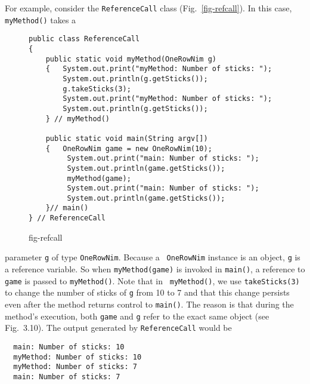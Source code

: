 For example, consider the {\tt ReferenceCall} class
(Fig.~\ref{fig-refcall}). In this case, {\tt myMethod()} takes a
\begin{figure}[h!]
\jjjprogstart
\begin{jjjlisting}
\begin{lstlisting}
public class ReferenceCall
{
    public static void myMethod(OneRowNim g)
    {   System.out.print("myMethod: Number of sticks: ");
        System.out.println(g.getSticks());
        g.takeSticks(3);
        System.out.print("myMethod: Number of sticks: ");
        System.out.println(g.getSticks());
    } // myMethod()

    public static void main(String argv[])
    {   OneRowNim game = new OneRowNim(10);
         System.out.print("main: Number of sticks: ");
         System.out.println(game.getSticks());
         myMethod(game);
         System.out.print("main: Number of sticks: ");
         System.out.println(game.getSticks());
    }// main()
} // ReferenceCall
\end{lstlisting}
\end{jjjlisting}
{fig-refcall}
\end{figure}
parameter {\tt g} of type {\tt OneRowNim}. Because a \mbox{\tt
OneRowNim} instance is an object, {\tt g} is a reference variable.  So
when {\tt myMethod(game)} is invoked in {\tt main()}, a reference to
{\tt game} is passed to {\tt myMethod()}. Note that in {\tt
myMethod()}, we use {\tt takeSticks(3)} to change the number of sticks
of {\tt g} from 10 to 7 and that this change persists even after the
method returns control to {\tt main()}. The reason is that during the
method's execution, both {\tt game} and {\tt g} refer to the exact
same object (see Fig.~3.10).  The output generated 
by {\tt ReferenceCall} would be

\begin{jjjlisting}
\begin{lstlisting}
  main: Number of sticks: 10
  myMethod: Number of sticks: 10
  myMethod: Number of sticks: 7
  main: Number of sticks: 7
\end{lstlisting}
\end{jjjlisting}


